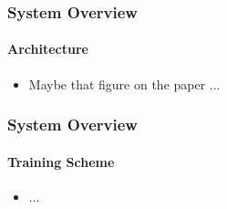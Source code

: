 \begin{frame}
    \frametitle{System Overview}
    \framesubtitle{Architecture}
    \begin{itemize}
        \item Maybe that figure on the paper ...
    \end{itemize}
\end{frame}

\begin{frame}
    \frametitle{System Overview}
    \framesubtitle{Training Scheme}
    \begin{itemize}
        \item ...
    \end{itemize}
\end{frame}
